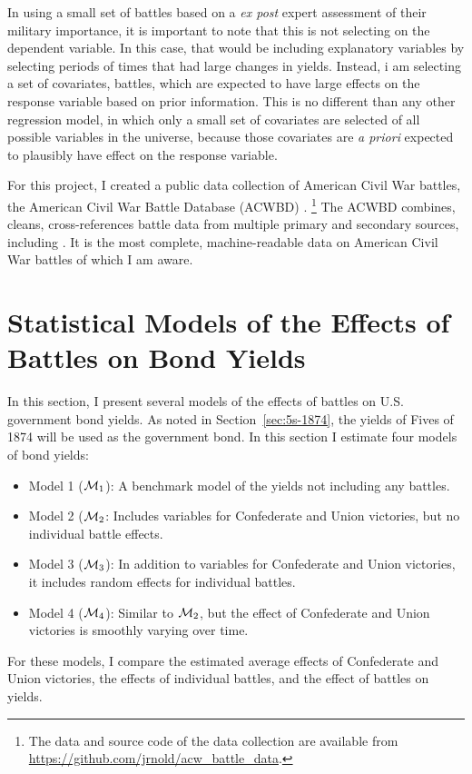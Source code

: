 In using a small set of battles based on a \textit{ex post} expert assessment of their military importance, it is important to note that this is not selecting on the dependent variable.
In this case, that would be including explanatory variables by selecting periods of times that had large changes in yields.
Instead, i am selecting a set of covariates, \ie{} battles, which are expected to have large effects on the response variable based on prior information.
This is no different than any other regression model, in which only a small set of covariates are selected of all possible variables in the universe, because those covariates are \textit{a priori} expected to plausibly have effect on the response variable.

For this project, I created a public data collection of American Civil War battles, the American Civil War Battle Database (ACWBD) \parencite{Arnold2015b}.%
\footnote{The data and source code of the data collection are available from \url{https://github.com/jrnold/acw_battle_data}.}
The ACWBD combines, cleans, cross-references battle data from multiple primary and secondary sources, including \textcites{Phisterer1883}{Livermore1900}{Bodart1908}{dyer1908_war_rebel}{KennedyConservation1998}{CWSAC1993}{cwsac2012}.
It is the most complete, machine-readable data on American Civil War battles of which I am aware.



\section{Statistical Models of the Effects of Battles on Bond Yields}
\label{sec:model-war-events}

In this section, I present several models of the effects of battles on U.S. government bond yields.
As noted in Section~\ref{sec:5s-1874}, the yields of Fives of 1874 will be used as the government bond.
In this section I estimate four models of bond yields:
\begin{itemize}
\item Model 1 ($\mathcal{M}_{\text{1}}$): A benchmark model of the yields not including any battles.
\item Model 2 ($\mathcal{M}_{\text{2}}$: Includes variables for Confederate and Union victories, but no individual battle effects.
\item Model 3 ($\mathcal{M}_{\text{3}}$): In addition to variables for Confederate and Union victories, it includes random effects for individual battles.
\item Model 4 ($\mathcal{M}_{\text{4}}$): Similar to $\mathcal{M}_{\text{2}}$, but the effect of Confederate and Union victories is smoothly varying over time.
\end{itemize}
For these models, I compare the estimated average effects of Confederate and Union victories, the effects of individual battles, and the effect of battles on yields.

